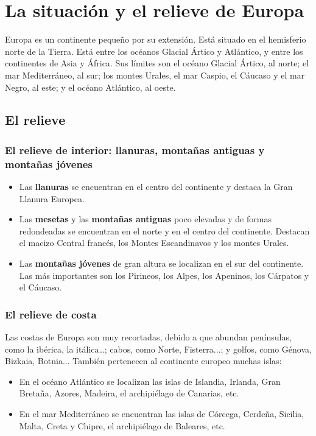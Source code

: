 \section{La situación y el relieve de Europa}

Europa es un continente pequeño por su extensión. Está situado en el hemisferio norte de la Tierra. Está entre los océanos Glacial Ártico y Atlántico, y entre los continentes de Asia y África. Sus límites son el océano Glacial Ártico, al norte; el mar Mediterráneo, al sur; los montes Urales, el mar Caspio, el Cáucaso y el mar Negro, al este; y el océano Atlántico, al oeste.

\subsection{El relieve}

\subsubsection{El relieve de interior: llanuras, montañas antiguas y montañas jóvenes}

\begin{itemize}
    \item Las \textbf{llanuras} se encuentran en el centro del continente y destaca la Gran Llanura Europea.
    \item Las \textbf{mesetas} y las \textbf{montañas antiguas} poco elevadas y de formas redondeadas se encuentran en el norte y en el centro del continente. Destacan el macizo Central francés, los Montes Escandinavos y los montes Urales.
    \item Las \textbf{montañas jóvenes} de gran altura se localizan en el sur del continente. Las más importantes son los Pirineos, los Alpes, los Apeninos, los Cárpatos y el Cáucaso.
\end{itemize}

\subsubsection{El relieve de costa}

Las costas de Europa son muy recortadas, debido a que abundan penínsulas, como la ibérica, la itálica…; cabos, como Norte, Fisterra...; y golfos, como Génova, Bizkaia, Botnia... También pertenecen al continente europeo muchas islas:
\begin{itemize}
    \item En el océano Atlántico se localizan las islas de Islandia, Irlanda, Gran Bretaña, Azores, Madeira, el archipiélago de Canarias, etc.
    \item En el mar Mediterráneo se encuentran las islas de Córcega, Cerdeña, Sicilia, Malta, Creta y Chipre, el archipiélago de Baleares, etc.
\end{itemize}

